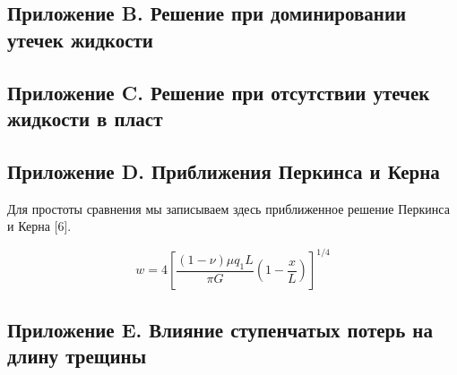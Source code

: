 \documentclass[a4paper, 11pt]{article}
\newcommand{\beq}{\begin{equation}}
\newcommand{\eeq}{\end{equation}}
\begin{document}
\subsection{Приложение B. Решение при доминировании утечек жидкости}

\subsection{Приложение C. Решение при отсутствии утечек жидкости в пласт}

\subsection{Приложение D. Приближения Перкинса и Керна}

Для простоты сравнения мы записываем здесь приближенное решение Перкинса и Керна [6].

\beq
w=4\left[\frac{(1-\nu)\mu q_1L}{\pi G}\left(1-\frac{x}{L}\right)\right]^{1/4}
\eeq


\subsection{Приложение E. Влияние ступенчатых потерь на длину трещины}
\end{document}
